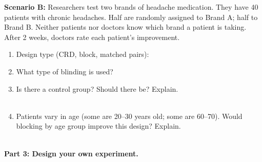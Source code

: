\documentclass[10pt]{article}
\begin{document}
\vspace{0.1in}

\textbf{Scenario B:} Researchers test two brands of headache medication. They have
40 patients with chronic headaches. Half are randomly assigned to Brand A;
half to Brand B. Neither patients nor doctors know which brand a patient is taking.
After 2 weeks, doctors rate each patient's improvement.

\begin{practicebox}
\small
\begin{enumerate}[leftmargin=1.5em, itemsep=7pt]
  \item Design type (CRD, block, matched pairs): 
  \item What type of blinding is used? 
  \item Is there a control group?  Should there be? Explain.\\
        \\[1pt]
  \item Patients vary in age (some are 20--30 years old; some are 60--70). Would
        blocking by age group improve this design? Explain.\\
        \\[1pt]
\end{enumerate}
\end{practicebox}

\vspace{0.1in}

\textbf{Part 3: Design your own experiment.}
\end{document}
